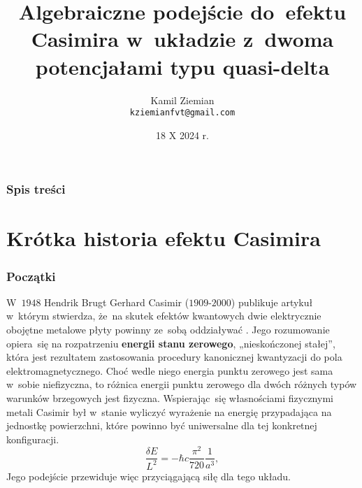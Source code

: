 \documentclass[10pt,t]{beamer}
\title{Algebraiczne podejście do~efektu Casimira w~układzie
  z~dwoma potencjałami typu quasi-delta}
\author{Kamil Ziemian \\
  \texttt{kziemianfvt@gmail.com}}
\date[18 X 2024]{18 X 2024 r.}
\begin{document}





\RaggedRight





\maketitle





\begin{frame}
  \frametitle{Spis treści}


  \tableofcontents %

\end{frame}










\section{Krótka historia efektu Casimira}



\begin{frame}
  \frametitle{Początki}


  W~$1948$ Hendrik Brugt Gerhard Casimir ($1909\text{-}2000$)
  publikuje artykuł w~którym stwierdza, że~na skutek efektów kwantowych
  dwie elektrycznie obojętne metalowe płyty powinny ze~sobą oddziaływać
  \parencite{Casimir-On-the-Attraction-Between-ETC-Pub-1948}. Jego
  rozumowanie opiera~się na rozpatrzeniu \textbf{energii stanu zerowego},
  „nieskończonej stałej”, która jest rezultatem zastosowania procedury
  kanonicznej kwantyzacji do pola elektromagnetycznego. Choć wedle niego
  energia punktu zerowego jest sama w~sobie niefizyczna, to różnica
  energii punktu zerowego dla dwóch różnych typów warunków brzegowych
  jest fizyczna. Wspierając~się własnościami fizycznymi metali
  Casimir był w~stanie wyliczyć wyrażenie na energię przypadająca na
  jednostkę powierzchni, które powinno być uniwersalne dla tej konkretnej
  konfiguracji.
  \begin{equation}
    \label{eq:Krotka-historia-ETC-01}
    \frac{ \delta E }{ L^{ 2 } } =
    -\hbar c \frac{ \pi^{ 2 } }{ 720 } \frac{ 1 }{ a^{ 3 } },
  \end{equation}
  Jego podejście przewiduje więc przyciągającą siłę dla tego układu.

\end{frame}
\end{document}
